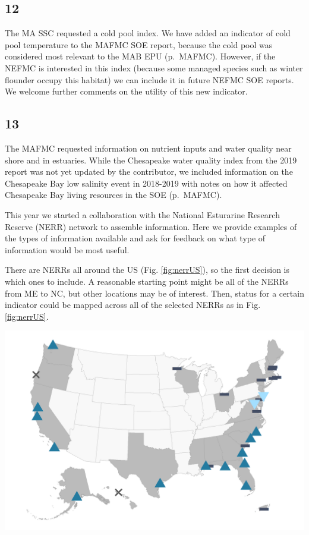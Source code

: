 \documentclass[
  10pt,
]{article}
\let\origfigure\figure
\let\endorigfigure\endfigure
\renewenvironment{figure}[1][2] {
    \expandafter\origfigure\expandafter[H]
} {
    \endorigfigure
}
\begin{document}
\hypertarget{section-11}{%
\subsection{12}\label{section-11}}

The MA SSC requested a cold pool index. We have added an indicator of
cold pool temperature to the MAFMC SOE report, because the cold pool was
considered most relevant to the MAB EPU (p.~MAFMC). However, if the
NEFMC is interested in this index (because some managed species such as
winter flounder occupy this habitat) we can include it in future NEFMC
SOE reports. We welcome further comments on the utility of this new
indicator.

\hypertarget{section-12}{%
\subsection{13}\label{section-12}}

The MAFMC requested information on nutrient inputs and water quality
near shore and in estuaries. While the Chesapeake water quality index
from the 2019 report was not yet updated by the contributor, we included
information on the Chesapeake Bay low salinity event in 2018-2019 with
notes on how it affected Chesapeake Bay living resources in the SOE
(p.~MAFMC).

This year we started a collaboration with the National Esturarine
Research Reserve (NERR) network to assemble information. Here we provide
examples of the types of information available and ask for feedback on
what type of information would be most useful.

There are NERRs all around the US (Fig. \ref{fig:nerrUS}), so the first
decision is which ones to include. A reasonable starting point might be
all of the NERRs from ME to NC, but other locations may be of interest.
Then, status for a certain indicator could be mapped across all of the
selected NERRs as in Fig. \ref{fig:nerrUS}.

\begin{figure}

{\centering \includegraphics[width=25in]{images/nerrs_map} 

}

\caption{National Estuarine Research Reserve locations in the US.}\label{fig:nerrUS}
\end{figure}
\end{document}
